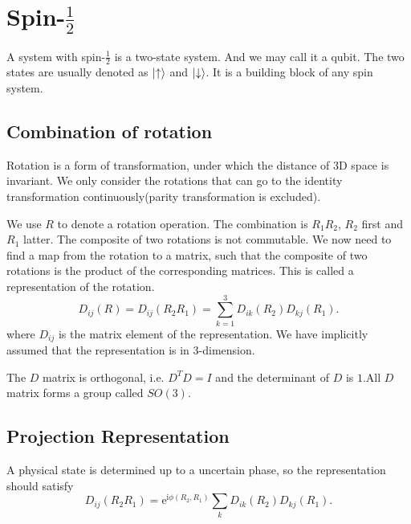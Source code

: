
\chapter[自旋$\frac{1}{2}$粒子]{Spin-$\frac{1}{2}$}

A system with spin-$\frac{1}{2}$ is a two-state system. And we may call it a qubit. The two states are usually denoted as $\ket{\uparrow}$ and $\ket{\downarrow}$. It is a building block of any spin system. 

\section[旋转的复合]{Combination of rotation}
Rotation is a form of transformation, under which the distance of 3D space is invariant. We only consider the rotations that can go to the identity transformation continuously(parity transformation is excluded). 

We use $R$ to denote a rotation operation. The combination is $R_1 R_2$, $R_2$ first and $R_1$ latter. The composite of two rotations is not commutable. We now need to find a map from the rotation to a matrix, such that the composite of two rotations is the product of the corresponding matrices. This is called a representation of the rotation.
\begin{equation}
  D_{ij}\left( R \right)  = D_{ij}\left( R_2 R_1 \right) = \sum_{k=1}^{3} D_{ik}\left( R_2 \right) D_{kj}\left( R_1 \right).
\end{equation}
where $D_{ij}$ is the matrix element of the representation. We have implicitly assumed that the representation is in 3-dimension.

The $D$ matrix is orthogonal, i.e. $D^T D = I$ and the determinant of $D$ is $1$.All $D$ matrix forms a group called $SO\left( 3 \right) $.


\section[投影表示]{Projection Representation}
A physical state is determined up to a uncertain phase, so the representation should satisfy
\begin{equation}
  D_{ij}\left( R_2R_1 \right) = \mathrm{e}^{\mathrm{i} \phi\left( R_2,R_1 \right) } \sum_{k} D_{ik}\left( R_2 \right) D_{kj} \left( R_1 \right) .
\end{equation}

